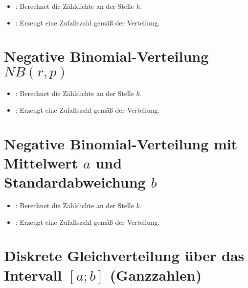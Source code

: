 \begin{itemize}

\item
{}:
Berechnet die Zähldichte an der Stelle $k$.


\item
{}:
Erzeugt eine Zufallszahl gemäß der Verteilung.

\end{itemize}



\section{Negative Binomial-Verteilung \texorpdfstring{$NB(r,p)$}{NB(r,p)}}

\begin{itemize}

\item
{}:
Berechnet die Zähldichte an der Stelle $k$.


\item
{}:
Erzeugt eine Zufallszahl gemäß der Verteilung.

\end{itemize}



\section{Negative Binomial-Verteilung mit Mittelwert \texorpdfstring{$a$}{a} und Standardabweichung \texorpdfstring{$b$}{b}}

\begin{itemize}

\item
{}:
Berechnet die Zähldichte an der Stelle $k$.


\item
{}:
Erzeugt eine Zufallszahl gemäß der Verteilung.

\end{itemize}



\section{Diskrete Gleichverteilung über das Intervall \texorpdfstring{$[a;b]$}{[a;b]} (Ganzzahlen)}

